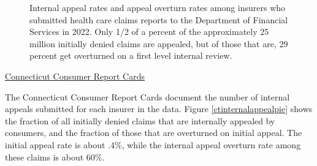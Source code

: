 \documentclass[12pt, a4paper,twoside,parskip=full]{report}
\theoremstyle{plain} %
\theoremstyle{definition} %
\theoremstyle{remark} %
\numberwithin{equation}{chapter}
\begin{document}
\begin{figure}[h!]
\begin{subfigure}[b]{0.49\textwidth}
			\end{subfigure}
			\caption{Internal appeal rates and appeal overturn rates among insurers who submitted health care claims reports to the Department of Financial Services in 2022. Only 1/2 of a percent of the approximately 25 million initially denied claims are appealed, but of those that are, 29 percent get overturned on a first level internal review.}
			\label{nyinternalappealpie}
		\end{figure}
	
		\underline{Connecticut Consumer Report Cards}
		
		The Connecticut Consumer Report Cards document the number of internal appeals submitted for each insurer in the data. Figure \ref{ctinternalappealpie} shows the fraction of all initially denied claims that are internally appealed by consumers, and the fraction of those that are overturned on initial appeal. The initial appeal rate is about .4\%, while the internal appeal overturn rate among these claims is about 60\%.
		
\end{document}
